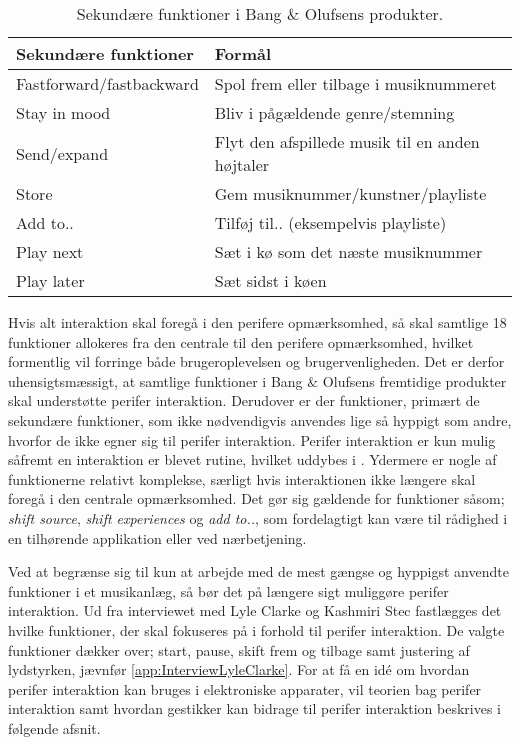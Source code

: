 \noindent
%
%
\begin{table}[H]
	\centering
	\begin{tabular}{ | l | p{8cm} |}
		\hline
		\multicolumn{1}{|l|}{\textbf{Sekundære funktioner}} & \multicolumn{1}{l|}{\textbf{Formål}} \\ \hline
		Fastforward/fastbackward & Spol frem eller tilbage i musiknummeret \\ \hline
		Stay in mood & Bliv i pågældende genre/stemning \\ \hline
		Send/expand & Flyt den afspillede musik til en anden højtaler \\ \hline
		Store & Gem musiknummer/kunstner/playliste \\ \hline
		Add to.. & Tilføj til.. (eksempelvis playliste) \\ \hline
		Play next & Sæt i kø som det næste musiknummer \\ \hline
		Play later & Sæt sidst i køen \\ \hline
	\end{tabular}
	\caption{Sekundære funktioner i Bang $\&$ Olufsens produkter.}
	\label{tab:BogOsSekundaereFunktioner}
\end{table}
\noindent
%
Hvis alt interaktion skal foregå i den perifere opmærksomhed, så skal samtlige 18 funktioner allokeres fra den centrale til den perifere opmærksomhed, hvilket formentlig vil forringe både brugeroplevelsen og brugervenligheden. Det er derfor uhensigtsmæssigt, at samtlige funktioner i Bang $\&$ Olufsens fremtidige produkter skal understøtte perifer interaktion. Derudover er der funktioner, primært de sekundære funktioner, som ikke nødvendigvis anvendes lige så hyppigt som andre, hvorfor de ikke egner sig til perifer interaktion. Perifer interaktion er kun mulig såfremt en interaktion er blevet rutine, hvilket uddybes i . Ydermere er nogle af funktionerne relativt komplekse, særligt hvis interaktionen ikke længere skal foregå i den centrale opmærksomhed. Det gør sig gældende for funktioner såsom; \textit{shift source}, \textit{shift experiences} og \textit{add to..}, som fordelagtigt kan være til rådighed i en tilhørende applikation eller ved nærbetjening.  

Ved at begrænse sig til kun at arbejde med de mest gængse og hyppigst anvendte funktioner i et musikanlæg, så bør det på længere sigt muliggøre perifer interaktion. Ud fra interviewet med Lyle Clarke og Kashmiri Stec fastlægges det hvilke funktioner, der skal fokuseres på i forhold til perifer interaktion. De valgte funktioner dækker over; start, pause, skift frem og tilbage samt justering af lydstyrken, jævnfør \autoref{app:InterviewLyleClarke}.\blankline
%
For at få en idé om hvordan perifer interaktion kan bruges i elektroniske apparater, vil teorien bag perifer interaktion samt hvordan gestikker kan bidrage til perifer interaktion beskrives i følgende afsnit. 

